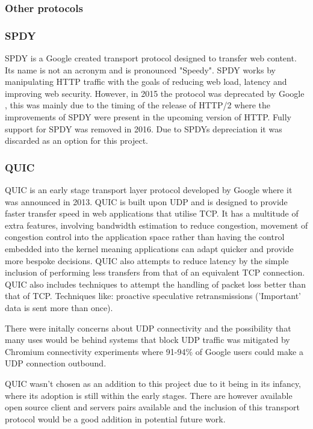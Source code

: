 \subsubsection{Other protocols}
\subsubsection*{SPDY}
SPDY \citep{belshe2012spdy} is a Google created transport protocol designed to transfer web content. Its name is not an acronym and is pronounced "Speedy". SPDY works by manipulating HTTP traffic with the goals of reducing web load, latency and improving web security. However, in 2015 the protocol was deprecated by Google \citep{blog2015hello}, this was mainly due to the timing of the release of HTTP/2 where the improvements of SPDY were present in the upcoming version of HTTP. Fully support for SPDY was removed in 2016. Due to SPDYs depreciation it was discarded as an option for this project.

\subsubsection*{QUIC}
QUIC \citep{hamilton2016quic} is an early stage transport layer protocol developed by Google where it was announced in 2013. QUIC is built upon UDP and is designed to provide faster transfer speed in web applications that utilise TCP.
It has a multitude of extra features, involving bandwidth estimation to reduce congestion, movement of congestion control into the application space rather than having the control embedded into the kernel meaning applications can adapt quicker and provide more bespoke decisions. QUIC also attempts to reduce latency by the simple inclusion of performing less transfers from that of an equivalent TCP connection. QUIC also includes techniques to attempt the handling of packet loss better than that of TCP. Techniques like: proactive speculative retransmissions ('Important' data is sent more than once).

There were initally concerns about UDP connectivity and the possibility that many uses would be behind systems that block UDP traffic was mitigated by Chromium connectivity experiments \citep{roskind2013quic} where 91-94\% of Google users could make a UDP connection outbound.

QUIC wasn't chosen as an addition to this project due to it being in its infancy, where its adoption is still within the early stages. There are however available open source client and servers pairs available and the inclusion of this transport protocol would be a good addition in potential future work.

